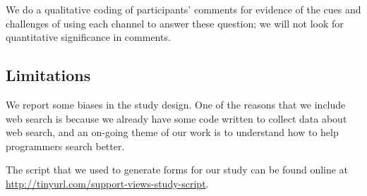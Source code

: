 We do a qualitative coding of participants' comments for evidence of the cues and challenges of using each channel to answer these question; we will not look for quantitative significance in comments.

\subsection{Limitations}

We report some biases in the study design.
One of the reasons that we include web search is because we already have some code written to collect data about web search, and an on-going theme of our work is to understand how to help programmers search better.

The script that we used to generate forms for our study can be found online at \url{http://tinyurl.com/support-views-study-script}.
\fi

